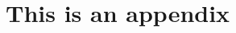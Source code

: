 \documentclass[useAMS,usenatbib,usegraphicx,nofootinbib]{mn2e}
\begin{document}



\appendix
\section[]{This is an appendix}
\end{document}

